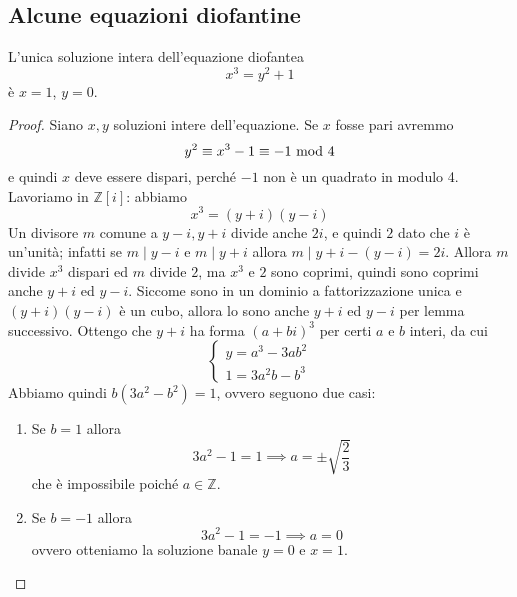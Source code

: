 \subsection{Alcune equazioni diofantine}
\begin{teorema}
	L'unica soluzione intera dell'equazione diofantea
	\begin{equation*}
	x^3=y^2+1
	\end{equation*}
	è $x=1$, $y=0$.
\end{teorema}
\begin{proof}
	Siano $x,y$ soluzioni intere dell'equazione. Se $x$ fosse pari avremmo 
	\begin{equation*}
	y^2\equiv x^3-1\equiv -1 \ \mathrm{mod}\ 4
	\end{equation*}
	 e quindi $x$ deve essere dispari, perché $-1$ non è un quadrato in modulo 4. Lavoriamo in $\mathbb{Z}[i]$: abbiamo 
	 \begin{equation*}
	 x^3=(y+i)(y-i)
	 \end{equation*}
	 Un divisore $m$ comune a $y-i, y+i$ divide anche $2i$, e quindi $2$ dato che $i$ è un'unità; infatti se $m \mid y-i$ e $m \mid y+i$ allora $m \mid y+i-(y-i) = 2i$. Allora $m$ divide $x^3$ dispari ed $m$ divide $2$, ma $x^3$ e $2$ sono coprimi, quindi sono coprimi anche $y+i$ ed $y-i$. Siccome sono in un dominio a fattorizzazione unica e $(y+i)(y-i)$ è un cubo, allora lo sono anche $y+i$ ed $y-i$ per lemma successivo. Ottengo che $y+i$ ha forma $(a+bi)^3$ per certi $a$ e $b$ interi, da cui 
	 \begin{equation*}
	 \begin{cases}
	 y=a^3-3ab^2\\1=3a^2b-b^3
	 \end{cases}
	 \end{equation*}
	 Abbiamo quindi $b(3a^2-b^2)=1$, ovvero seguono due casi:
	 \begin{enumerate}
	 	\item Se $b = 1$ allora 
	 		\begin{equation*}
	 			3a^2-1=1 \implies a=\pm\sqrt{\frac{2}{3}}
	 		\end{equation*}
 			che è impossibile poiché $a\in \mathbb{Z}$.
 		\item Se $b = -1$ allora 
 			\begin{equation*}
 				3a^2-1=-1 \implies a=0
 			\end{equation*} 
 			ovvero otteniamo la soluzione banale $y = 0$ e $x = 1$.
	 \end{enumerate}
\end{proof}
